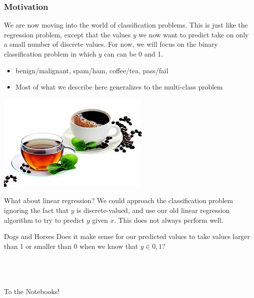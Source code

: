 \documentclass[table,dvipsnames]{beamer}
\newcommand{\keywd}{\textcolor{myorange}}
\begin{document}
\begin{frame}
 \frametitle{Motivation}
\scriptsize
We are now moving into the world of \keywd{classification problems}. This is just like the regression
problem, except that the values $y$ we now want to predict take on only a small number of discrete values. 
For now, we will focus on the binary classification problem in which $y$ can can be 0 and 1.
\vspace{1cm}
\begin{itemize}
 \item benign/malignant, spam/ham, coffee/tea, pass/fail
 \item Most of what we describe here generalizes to the multi-class problem
\end{itemize}

\begin{center}
\includegraphics[scale=0.4]{tea-vs-coffee.jpeg}
\end{center}

\end{frame}


\begin{frame}
\scriptsize
\begin{block}{What about linear regression?}
We could approach the classification problem ignoring the fact that $y$ is
discrete-valued, and use our old linear regression algorithm to try to predict
$y$ given $x$. This does not always perform well. 
\end{block}

\begin{block}{Dogs and Horses}
Does it make sense for our predicted values to take values larger than 1 or smaller than 0 when we know that $y \in {0, 1}$?
\end{block}
\ \\ \ \\ \ \\
To the Notebooks!

\end{frame}
\end{document}
